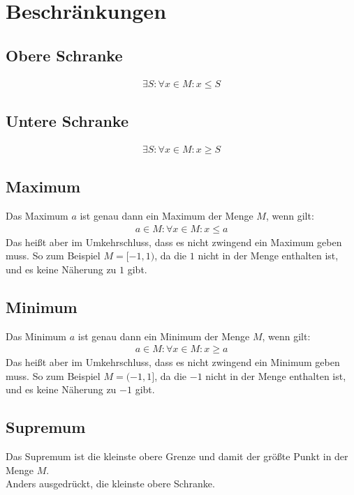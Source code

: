 \documentclass[11pt]{article}
\begin{document}
    \section{Beschränkungen}\label{sec:beschrankungen}

    \subsection{Obere Schranke}\label{subsec:obere-schranke}
    \begin{align*}
        \exists S:\forall x\in M: x\leq S
    \end{align*}

    \subsection{Untere Schranke}\label{subsec:untere-schranke}
    \begin{align*}
        \exists S:\forall x\in M: x\geq S
    \end{align*}

    \subsection{Maximum}\label{subsec:maximum}
    Das Maximum $a$ ist genau dann ein Maximum der Menge $M$, wenn gilt:
    \begin{align*}
        a\in M: \forall x\in M: x\leq a
    \end{align*}
    Das heißt aber im Umkehrschluss, dass es nicht zwingend ein Maximum geben muss.
    So zum Beispiel $M=[-1,1)$, da die $1$ nicht in der Menge enthalten ist, und es keine Näherung zu $1$ gibt.

    \subsection{Minimum}\label{subsec:minimum}
    Das Minimum $a$ ist genau dann ein Minimum der Menge $M$, wenn gilt:
    \begin{align*}
        a\in M: \forall x\in M: x\geq a
    \end{align*}
    Das heißt aber im Umkehrschluss, dass es nicht zwingend ein Minimum geben muss.
    So zum Beispiel $M=(-1,1]$, da die $-1$ nicht in der Menge enthalten ist, und es keine Näherung zu $-1$ gibt.

    \subsection{Supremum}\label{subsec:supremum}
    Das Supremum ist die kleinste obere Grenze und damit der größte Punkt in der Menge $M$.\\
    Anders ausgedrückt, die kleinste obere Schranke.
\end{document}
